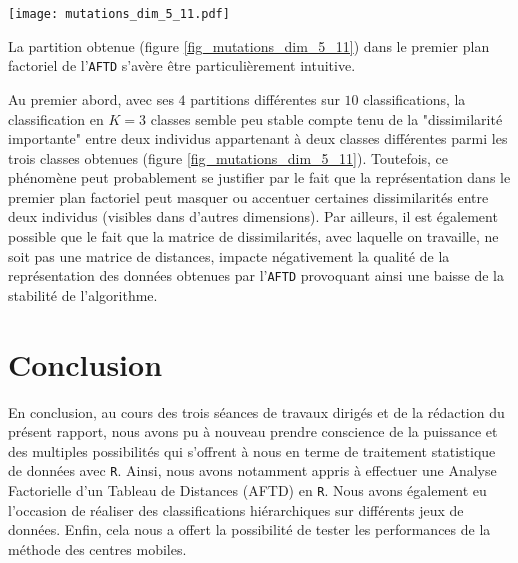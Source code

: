 \documentclass{article}
\begin{document}
\begin{multicols}{2}
\begingroup
   \centering
   \texttt{[image: mutations\_dim\_5\_11.pdf]}
    \label{fig_mutations_dim_5_11}
\endgroup

La partition obtenue (figure \ref{fig_mutations_dim_5_11}) dans le premier plan factoriel de l'\texttt{AFTD} s'avère être particulièrement intuitive. 

Au premier abord, avec ses $4$ partitions différentes sur $10$ classifications, la classification en $K = 3$ classes semble peu stable compte tenu de la "dissimilarité importante" entre deux individus appartenant à deux classes différentes parmi les trois classes obtenues (figure \ref{fig_mutations_dim_5_11}). Toutefois, ce phénomène peut probablement se justifier par le fait que la représentation dans le premier plan factoriel peut masquer ou accentuer certaines dissimilarités entre deux individus (visibles dans d'autres dimensions). Par ailleurs, il est également possible que le fait que la matrice de dissimilarités, avec laquelle on travaille, ne soit pas une matrice de distances, impacte négativement la qualité de la représentation des données obtenues par l'\texttt{AFTD} provoquant ainsi une baisse de la stabilité de l'algorithme. 

\section{Conclusion}
En conclusion, au cours des trois séances de travaux dirigés et de la rédaction du présent rapport, nous avons pu à nouveau prendre conscience de la puissance et des multiples possibilités qui s’offrent à nous en terme de traitement statistique de données avec \texttt{R}. Ainsi, nous avons notamment appris à effectuer une Analyse Factorielle d'un Tableau de Distances (AFTD) en \texttt{R}. Nous avons également eu l'occasion de réaliser des classifications hiérarchiques sur différents jeux de données. Enfin, cela nous a offert la possibilité de tester les performances de la méthode des centres mobiles.
\end{multicols}
\end{document}
